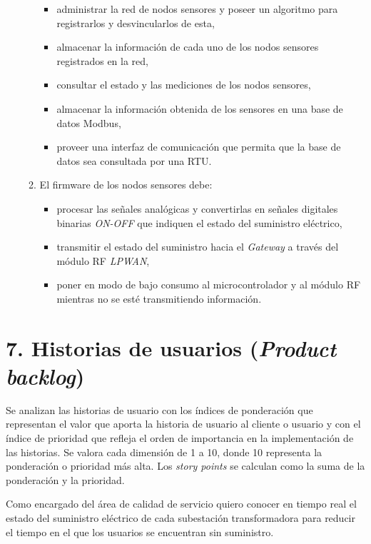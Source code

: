 \documentclass[
11pt, %
]{charter}
\begin{document}
\begin{enumerate}
\begin{enumerate}
\begin{itemize}
					\item administrar la red de nodos sensores y poseer un algoritmo para registrarlos y desvincularlos de esta,
					\item almacenar la información de cada uno de los nodos sensores registrados en la red,
					\item consultar el estado y las mediciones de los nodos sensores,
					\item almacenar la información obtenida de los sensores en una base de datos Modbus,
					\item proveer una interfaz de comunicación que permita que la base de datos sea consultada por una RTU.
				\end{itemize}
			\item El firmware de los nodos sensores debe:
				\begin{itemize}
					\item procesar las señales analógicas y convertirlas en señales digitales binarias \textit{ON-OFF} que indiquen el estado del suministro eléctrico,
					\item transmitir el estado del suministro hacia el \textit{Gateway} a través del módulo RF \textit{LPWAN},
					\item poner en modo de bajo consumo al microcontrolador y al módulo RF mientras no se esté transmitiendo información.
				\end{itemize}
		\end{enumerate}
\end{enumerate}


\section{7. Historias de usuarios (\textit{Product backlog})}
\label{sec:backlog}

Se analizan las historias de usuario con los índices de ponderación que representan el valor que
aporta la historia de usuario al cliente o usuario y con el índice de prioridad que refleja el orden
de importancia en la implementación de las historias. Se valora cada dimensión de 1 a 10, donde
10 representa la ponderación o prioridad más alta. Los \textit{story points} se calculan como la suma
de la ponderación y la prioridad.

Como encargado del área de calidad de servicio quiero conocer en tiempo real el estado del suministro eléctrico de cada subestación transformadora para reducir el tiempo en el que los usuarios se encuentran sin suministro.
\end{document}
